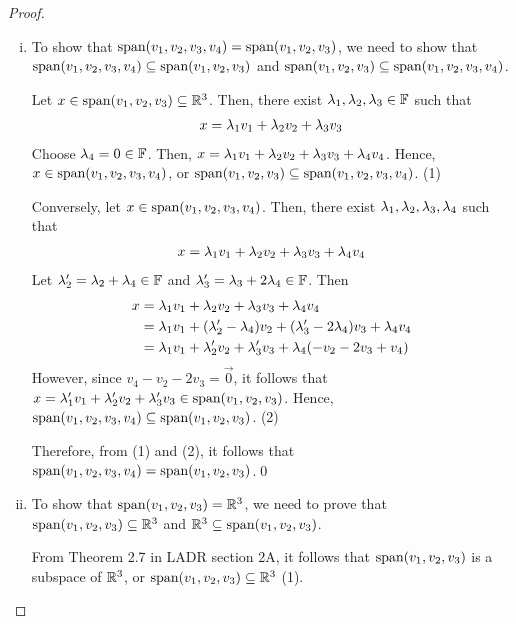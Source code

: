 \renewcommand{\qedsymbol}{$ $}
\begin{proof}
    \begin{enumerate}[(i)]
        \renewcommand{\qedsymbol}{$\blacksquare$}
        \item To show that $\textnormal{span}(v_1,v_2,v_3,v_4)=\textnormal{span}(v_1,v_2,v_3)$, we need to show that $\textnormal{span}(v_1,v_2,v_3,v_4)\subseteq\textnormal{span}(v_1,v_2,v_3)$ and $\textnormal{span}(v_1,v_2,v_3)\subseteq\textnormal{span}(v_1,v_2,v_3,v_4)$.
        
        Let $x\in\textnormal{span}(v_1,v_2,v_3)\subseteq\mathbb R^3$. Then, there exist $\lambda_1,\lambda_2,\lambda_3\in\mathbb F$ such that
        \[
            \begin{aligned}
                x=\lambda_1v_1+\lambda_2v_2+\lambda_3v_3
            \end{aligned}    
        \]
        Choose $\lambda_4=0\in\mathbb F$. Then, $x=\lambda_1v_1+\lambda_2v_2+\lambda_3v_3+\lambda_4v_4$. Hence, $x\in\textnormal{span}(v_1,v_2,v_3,v_4)$, or $\textnormal{span}(v_1,v_2,v_3)\subseteq\textnormal{span}(v_1,v_2,v_3,v_4)$. (1)
        
        Conversely, let $x\in\textnormal{span}(v_1,v_2,v_3,v_4)$. Then, there exist $\lambda_1,\lambda_2,\lambda_3,\lambda_4$ such that
        \[
            \begin{aligned}
                x=\lambda_1v_1+\lambda_2v_2+\lambda_3v_3+\lambda_4v_4
            \end{aligned}
        \]  
        Let $\lambda_2'=\lambda_2+\lambda_4\in\mathbb F$ and $\lambda_3'=\lambda_3+2\lambda_4\in\mathbb F$. Then
        \[
            \begin{aligned}
                x &= \lambda_1v_1+\lambda_2v_2+\lambda_3v_3+\lambda_4v_4\\
                  &= \lambda_1v_1+(\lambda_2'-\lambda_4)v_2+(\lambda_3'-2\lambda_4)v_3+\lambda_4v_4\\
                  &= \lambda_1v_1+\lambda_2'v_2+\lambda_3'v_3+\lambda_4(-v_2-2v_3+v_4)
            \end{aligned}  
        \]
        However, since $v_4-v_2-2v_3=\vec{0}$, it follows that $x=\lambda_1'v_1+\lambda_2'v_2+\lambda_3'v_3\in\textnormal{span}(v_1,v_2,v_3)$. Hence, $\textnormal{span}(v_1,v_2,v_3,v_4)\subseteq\textnormal{span}(v_1,v_2,v_3)$. (2)

        Therefore, from (1) and (2), it follows that $\textnormal{span}(v_1,v_2,v_3,v_4)=\textnormal{span}(v_1,v_2,v_3)$.\qed
        \item To show that $\textnormal{span}(v_1,v_2,v_3)=\mathbb R^3$, we need to prove that $\textnormal{span}(v_1,v_2,v_3)\subseteq\mathbb R^3$ and $\mathbb R^3\subseteq\textnormal{span}(v_1,v_2,v_3)$.

        From Theorem 2.7 in LADR section 2A, it follows that $\textnormal{span}(v_1,v_2,v_3)$ is a subspace of $\mathbb R^3$, or $\textnormal{span}(v_1,v_2,v_3)\subseteq\mathbb R^3$ (1).


\end{enumerate}
\end{proof}
